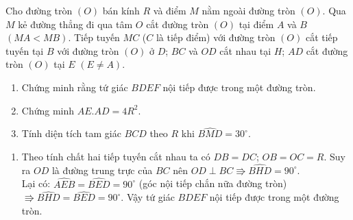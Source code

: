 \begin{ex}%
    Cho đường tròn $(O)$ bán kính $R$ và điểm $M$ nằm ngoài đường tròn $(O)$. Qua $M$ kẻ đường thẳng đi qua tâm $O$ cắt đường tròn $(O)$ tại điểm $A$ và $B$ $(MA<MB)$. Tiếp tuyến $MC$ ($C$ là tiếp điểm) với đường tròn $(O)$ cắt tiếp tuyến tại $B$ với đường tròn $(O)$ ở $D$; $BC$ và $OD$ cắt nhau tại $H$; $AD$ cắt đường tròn $(O)$ tại $E$ $(E\neq A)$. 
    \begin{enumerate}
        \item Chứng minh rằng tứ giác $BDEF$ nội tiếp được trong một đường tròn.
        \item Chứng minh $AE.AD=4R^2$.
        \item Tính diện tích tam giác $BCD$ theo $R$ khi $\widehat{BMD}=30^\circ$.
    \end{enumerate}
\loigiai
    {
  \begin{center}
  \end{center}

    \begin{enumerate}
        \item Theo tính chất hai tiếp  tuyến cắt nhau ta có $DB=DC$; $OB=OC=R$. Suy ra $OD$ là đường trung trực của $BC$ nên $OD\perp BC\Rrightarrow \widehat{BHD}=90^\circ$.\\
        Lại có: $\widehat{AEB}=\widehat{BED}=90^\circ$ (góc nội tiếp chắn nữa đường tròn) $\Rrightarrow\widehat{BHD}=\widehat{BED}=90^\circ$. Vậy tứ giác $BDEF$ nội tiếp được trong một đường tròn.
      

\end{enumerate}}
\end{ex}
